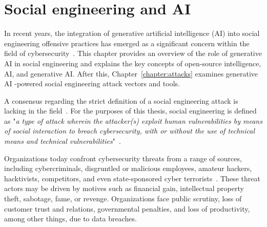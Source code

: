 \chapter{Social engineering and AI\label{chapter:background}}

%
%
In recent years, the integration of generative artificial intelligence (AI) into social engineering offensive practices has emerged as a significant concern within the field of cybersecurity~\citep{blauth_AI_Crime_Overview_Malicious_Use_Abuse_2022, king_AI_Crime_Interdisciplinary_Analysis_2019, mirsky_Threat_Offensive_AI_Organizations_2023}. This chapter provides an overview of the role of generative AI in social engineering and explains the key concepts of open-source intelligence, AI, and generative AI. After this, Chapter~\ref{chapter:attacks} examines generative AI -powered social engineering attack vectors and tools.



%
%
A consensus regarding the strict definition of a social engineering attack is lacking in the field~\citep{hatfield_SE_Evolution_Concept_2018}. For the purposes of this thesis, social engineering is defined as "\textit{a type of attack wherein the attacker(s) exploit human vulnerabilities by means of social interaction to breach cybersecurity, with or without the use of technical means and technical vulnerabilities}"~\citep{wang_Defining_Social_Engineering_2020}.



%
%
Organizations today confront cybersecurity threats from a range of sources, including cybercriminals, disgruntled or malicious employees, amateur hackers, hacktivists, competitors, and even state-sponsored cyber terrorists~\citep{mirsky_Threat_Offensive_AI_Organizations_2023}. These threat actors may be driven by motives such as financial gain, intellectual property theft, sabotage, fame, or revenge. Organizations face public scrutiny, loss of customer trust and relations, governmental penalties, and loss of productivity, among other things, due to data breaches.


